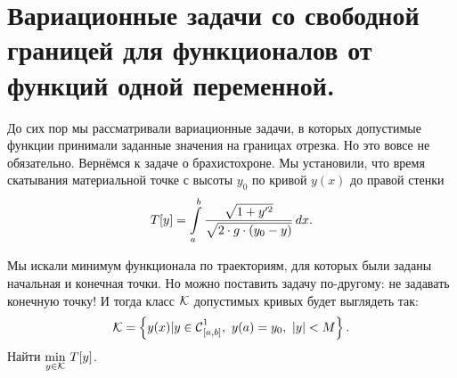 \section[Задачи со свободными концами.]{Вариационные задачи со свободной границей для функционалов от функций одной переменной.}
\label{lecture3section2}
До сих пор мы рассматривали вариационные задачи, в которых допустимые функции принимали заданные значения на границах отрезка. Но это вовсе не обязательно. Вернёмся к задаче о брахистохроне. Мы установили, что время скатывания материальной точке с высоты $y_0$ по кривой $y(x)$ до правой стенки 
\begin{equation*}
	\hfill T[y]=\int\limits_a^b\frac{\sqrt{1+y^{\prime2}}}{\sqrt{2\cdot g\cdot(y_0-y)}}\,dx.\hfill
\end{equation*}



Мы искали минимум функционала по траекториям, для которых были заданы начальная и конечная точки. Но можно поставить задачу по-другому: не задавать конечную точку! И тогда класс $\mathcal{K}$ допустимых кривых будет выглядеть так:
\begin{equation*}
	\hfill\K=\left\{y(x)|y\in\Cfn[{[a,b]}]{1},\ y(a)=y_0,\ |y|<M\right\}.\hfill
\end{equation*}
Найти $\displaystyle\min\limits_{y\in\mathcal{K}}\,T[y]$.


